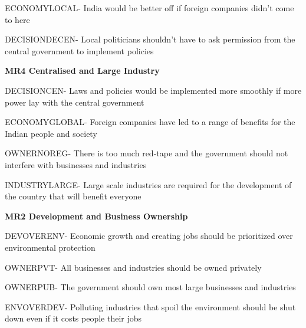\documentclass[
]{article}
\begin{document}
ECONOMYLOCAL- India would be better off if foreign companies didn't come
to here

DECISIONDECEN- Local politicians shouldn't have to ask permission from
the central government to implement policies

\textbf{MR4 Centralised and Large Industry}

DECISIONCEN- Laws and policies would be implemented more smoothly if
more power lay with the central government

ECONOMYGLOBAL- Foreign companies have led to a range of benefits for the
Indian people and society

OWNERNOREG- There is too much red-tape and the government should not
interfere with businesses and industries

INDUSTRYLARGE- Large scale industries are required for the development
of the country that will benefit everyone

\textbf{MR2 Development and Business Ownership}

DEVOVERENV- Economic growth and creating jobs should be prioritized over
environmental protection

OWNERPVT- All businesses and industries should be owned privately

OWNERPUB- The government should own most large businesses and industries

ENVOVERDEV- Polluting industries that spoil the environment should be
shut down even if it costs people their jobs
\end{document}
